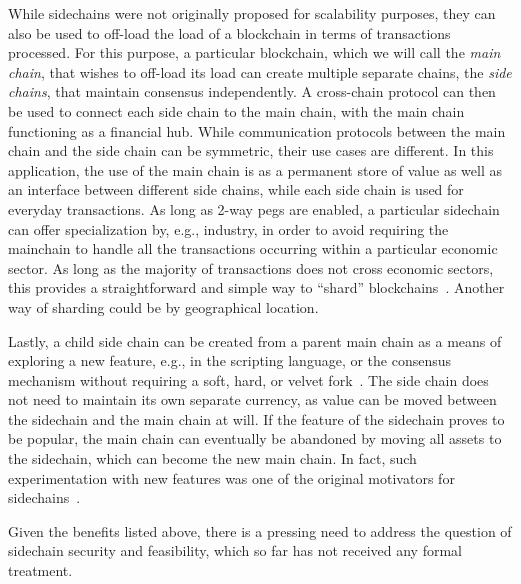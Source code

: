 While sidechains were not originally proposed for scalability purposes, they can
also be used to off-load the load of a blockchain in terms of transactions
processed. For this purpose, a particular blockchain, which we will call the
\emph{main chain}, that wishes to off-load its load can create multiple separate
chains, the \emph{side chains}, that maintain consensus independently. A
cross-chain protocol can then be used to connect each side chain to the main
chain, with the main chain functioning as a financial hub. While communication
protocols between the main chain and the side chain can be symmetric, their use
cases are different. In this application, the use of the main chain is as a
permanent store of value as well as an interface between different side chains,
while each side chain is used for everyday transactions. As long as 2-way pegs
are enabled, a particular sidechain can offer specialization by, e.g., industry,
in order to avoid requiring the mainchain to handle all the transactions
occurring within a particular economic sector. As long as the majority of
transactions does not cross economic sectors, this provides a straightforward
and simple way to ``shard'' blockchains~\cite{sharding,omniledger,rapidchain}.
Another way of sharding could be by geographical location.

Lastly, a child side chain can be created from a parent main chain as a means of
exploring a new feature, e.g., in the scripting language, or the consensus
mechanism without requiring a soft, hard, or velvet fork~\cite{nipopows,velvet}.
The side chain does not need to maintain its own separate currency, as value can
be moved between the sidechain and the main chain at will. If the feature of the
sidechain proves to be popular, the main chain can eventually be abandoned by
moving all assets to the sidechain, which can become the new main chain. In
fact, such experimentation with new features was one of the original motivators
for sidechains~\cite{sidechains}.

Given the benefits listed above, there is a pressing need to address the
question of sidechain security and feasibility, which so far has not received
any formal treatment.
